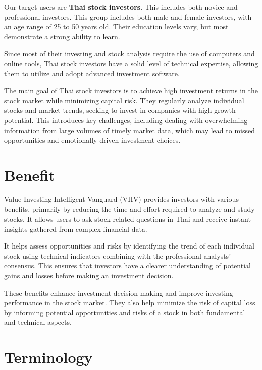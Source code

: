 Our target users are \textbf{Thai stock investors}. This includes both novice and professional investors.
This group includes both male and female investors, with an age range of 25 to 50 years old.
Their education levels vary, but most demonstrate a strong ability to learn.

Since most of their investing and stock analysis require the use of computers and online tools,
Thai stock investors have a solid level of technical expertise, allowing them to utilize and adopt advanced investment software.

The main goal of Thai stock investors is to achieve high investment returns in the stock market while minimizing capital risk.
They regularly analyze individual stocks and market trends, seeking to invest in companies with high growth potential.
This introduces key challenges, including dealing with overwhelming information from large volumes of timely market data,
which may lead to missed opportunities and emotionally driven investment choices.

\section{Benefit}
\label{section:benefit}

Value Investing Intelligent Vanguard (VIIV) provides investors with various benefits, primarily by reducing the time and effort
required to analyze and study stocks. It allows users to ask stock-related questions in Thai and receive instant insights gathered
from complex financial data.

It helps assess opportunities and risks by identifying the trend of each individual stock using technical indicators
combining with the professional analysts' consensus. This ensures that investors have a clearer understanding of potential gains and
losses before making an investment decision.

These benefits enhance investment decision-making and improve investing performance in the stock market. They also help minimize the
risk of capital loss by informing potential opportunities and risks of a stock in both fundamental and technical aspects.

\section{Terminology}
\label{section:terminology}

